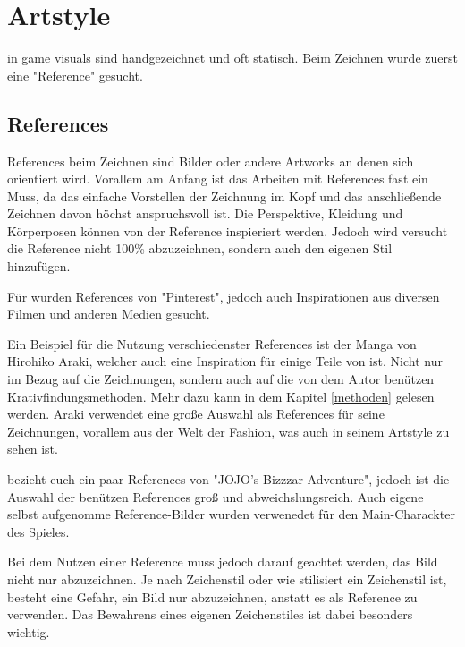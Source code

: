 \section{Artstyle}\label{sec:artstyle}

\renewcommand{\kapitelautor}{Autor: Philip Jankovic}

\FF in game visuals sind handgezeichnet und oft statisch. Beim Zeichnen wurde zuerst eine "Reference" gesucht.


\subsection{References}\label{subsec:references}
References beim Zeichnen sind Bilder oder andere Artworks an denen sich orientiert wird. Vorallem am Anfang ist das
Arbeiten mit References fast ein Muss, da das einfache Vorstellen der Zeichnung im Kopf und das anschließende Zeichnen davon höchst anspruchsvoll ist.
Die Perspektive, Kleidung und Körperposen können von der Reference inspieriert werden.
Jedoch wird versucht die Reference nicht 100\% abzuzeichnen, sondern auch den eigenen Stil hinzufügen. 


Für \FF wurden References von "Pinterest", jedoch auch Inspirationen aus diversen Filmen und anderen Medien gesucht. 


Ein Beispiel für die Nutzung verschiedenster References ist der Manga  von Hirohiko Araki,
welcher auch eine Inspiration für einige Teile von \FF ist. Nicht nur im Bezug auf die Zeichnungen, sondern auch auf die von dem Autor benützen Krativfindungsmethoden.
Mehr dazu kann in dem Kapitel \ref{methoden} gelesen werden.
Araki verwendet eine große Auswahl als References für seine Zeichnungen, vorallem aus der Welt
der Fashion, was auch in seinem Artstyle zu sehen ist.


\FF bezieht euch ein paar References von "JOJO's Bizzzar Adventure", jedoch ist die Auswahl der benützen References groß und abweichslungsreich.
Auch eigene selbst aufgenomme Reference-Bilder wurden verwenedet für \zB den Main-Charackter des Spieles.



Bei dem Nutzen einer Reference muss jedoch darauf geachtet werden, das Bild nicht nur abzuzeichnen. Je nach Zeichenstil
oder wie stilisiert ein Zeichenstil ist, besteht eine Gefahr, ein Bild nur abzuzeichnen, anstatt es als Reference zu verwenden.
Das Bewahrens eines eigenen Zeichenstiles ist dabei besonders wichtig.


